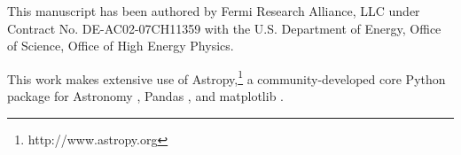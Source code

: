\documentclass[fleqn,usenatbib,]{mnras}
\begin{document}
This manuscript has been authored by Fermi Research Alliance, LLC under Contract No. DE-AC02-07CH11359 with the U.S. Department of Energy, Office of Science, Office of High Energy Physics.

This work makes extensive use of Astropy,\footnote{http://www.astropy.org} a community-developed core Python package for Astronomy \citep{AstropyCollaboration2013,AstropyCollaboration2018}, Pandas \citep{Mckinney2010}, and matplotlib \citep{Hunter2007}.











\appendix
\end{document}
